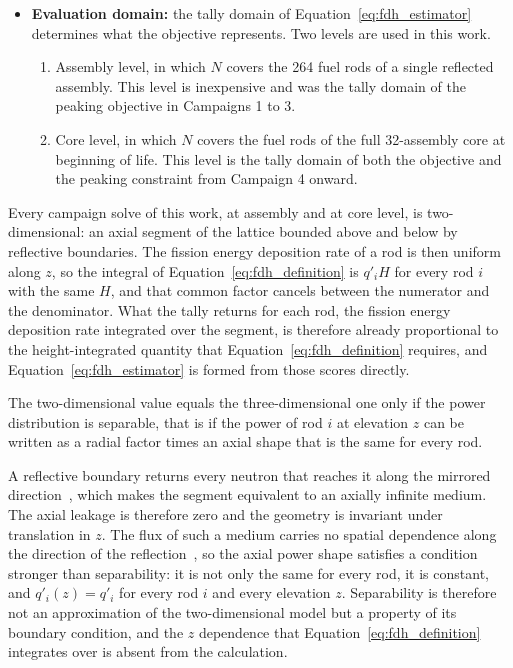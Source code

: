 \begin{itemize}
  \item \textbf{Evaluation domain:} the tally domain of
        Equation~\eqref{eq:fdh_estimator} determines what the objective
        represents. Two levels are used in this work.

\begin{enumerate}
  \item Assembly level, in which $N$ covers the 264 fuel rods of a
        single reflected assembly. This level is inexpensive and was the
        tally domain of the peaking objective in Campaigns 1 to 3.

  \item Core level, in which $N$ covers the fuel rods of the full
        32-assembly core at beginning of life. This level is the tally
        domain of both the objective and the peaking constraint from
        Campaign 4 onward.
\end{enumerate}
\end{itemize}

Every campaign solve of this work, at assembly and at core level, is
two-dimensional: an axial segment of the lattice bounded above and
below by reflective boundaries. The fission energy
deposition rate of a rod is then uniform along $z$, so the integral of
Equation~\eqref{eq:fdh_definition} is $q'_i H$ for every rod $i$ with
the same $H$, and that common factor cancels between the numerator and
the denominator. What the tally returns for each rod, the fission
energy deposition rate integrated over the segment, is therefore already
proportional to the height-integrated quantity that
Equation~\eqref{eq:fdh_definition} requires, and
Equation~\eqref{eq:fdh_estimator} is formed from those scores directly.

The two-dimensional value equals the three-dimensional one only if the
power distribution is separable, that is if the power of rod $i$ at
elevation $z$ can be written as a radial factor times an axial shape
that is the same for every rod.

A reflective boundary returns every neutron that reaches it along the
mirrored direction~\cite{openmc_docs}, which makes the segment
equivalent to an axially infinite medium. The axial leakage is
therefore zero and the geometry is invariant under translation in $z$.
The flux of such a medium carries no spatial dependence along the
direction of the
reflection~\cite{duderstadt_hamilton_1976}, so the axial power shape
satisfies a condition stronger than separability: it is not only the
same for every rod, it is constant, and $q'_i(z) = q'_i$ for every rod
$i$ and every elevation $z$. Separability is therefore not an
approximation of the two-dimensional model but a property of its
boundary condition, and the $z$ dependence that
Equation~\eqref{eq:fdh_definition} integrates over is absent from the
calculation.

